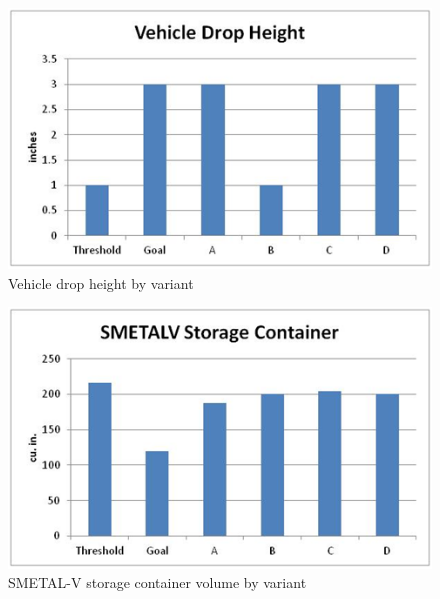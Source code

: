 \documentclass[letterpaper,10pt]{article}
\begin{document}
\begin{figure}[h!tbp]
	\begin{center}
		\includegraphics[scale=0.8]{images/vehicleDropHeight.png}
	\end{center}
	\caption{Vehicle drop height by variant}
	\label{fig:vehicleDropHeight}
\end{figure}

\begin{figure}[h!tbp]
	\begin{center}
		\includegraphics[scale=0.8]{images/smetalvStorageContainer.png}
	\end{center}
	\caption{SMETAL-V storage container volume by variant}
	\label{fig:smetalvStorageContainer}
\end{figure}
\end{document}

